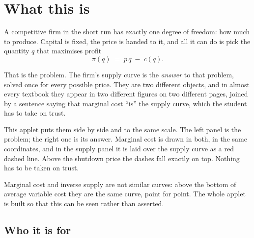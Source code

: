 \documentclass[11pt,a4paper]{appletmanual}
\begin{document}

\manualtoc
\thispagestyle{empty}
\clearpage
\setcounter{page}{1}

\section{What this is}

A competitive firm in the short run has exactly one degree of freedom: how much
to produce. Capital is fixed, the price is handed to it, and all it can do is
pick the quantity $q$ that maximises profit
\[
  \pi(q) \;=\; p\,q \;-\; c(q).
\]

That is the problem. The firm's supply curve is the \emph{answer} to that
problem, solved once for every possible price. They are two different objects,
and in almost every textbook they appear in two different figures on two
different pages, joined by a sentence saying that marginal cost ``is'' the
supply curve, which the student has to take on trust.

This applet puts them side by side and to the same scale. The left panel is
the problem; the right one is its answer. Marginal cost is drawn in both, in the
same coordinates, and in the supply panel it is laid over the supply curve as a
red dashed line. Above the shutdown price the dashes fall exactly on top.
Nothing has to be taken on trust.


\begin{amkey}
Marginal cost and inverse supply are not similar curves: above the bottom of
average variable cost they are the same curve, point for point. The whole
applet is built so that this can be seen rather than asserted.
\end{amkey}

\subsection{Who it is for}
\end{document}
